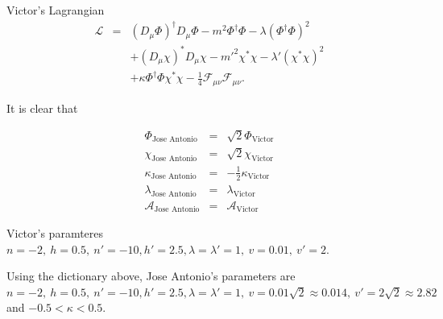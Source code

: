 \documentclass[10pt,a4paper]{article}
\begin{document}
Victor's Lagrangian
\begin{eqnarray} 
	\mathcal{L} & = & (D_{\mu}\Phi)^{\dagger}D_{\mu}\Phi - m^2\Phi^{\dagger}\Phi - \lambda(\Phi^{\dagger}\Phi)^2 \nonumber\\
 & & +(D_{\mu} \chi)^*D_{\mu} \chi - m'^2\chi^*\chi - \lambda'(\chi^* \chi)^2  \nonumber \\ 
 & & +\kappa\Phi^\dagger\Phi\chi^*\chi- \frac{1}{4}\mathcal{F}_{\mu\nu}\mathcal{F}_{\mu\nu}. %
\end{eqnarray}

%

It is clear that

\begin{eqnarray*}
 \Phi_{\text{Jose Antonio}}    & = &\sqrt{2}\Phi_{\text{Victor}}\\
 \chi_{\text{Jose Antonio}}    & = &\sqrt{2}\chi_{\text{Victor}}\\
 \kappa_{\text{Jose Antonio}}  & = &-\frac{1}{2}\kappa_{\text{Victor}}\\
 \lambda_{\text{Jose Antonio}} & = &\lambda_{\text{Victor}} \\
 \mathcal{A}_{\text{Jose Antonio}} & = &\mathcal{A}_{\text{Victor}}
\end{eqnarray*}


Victor's paramteres $n = -2,\  h = 0.5,\ n' = -10, h' = 2.5, \lambda=\lambda' = 1,\ v =0.01,\ v' = 2 $.

Using the dictionary above, Jose Antonio's parameters are $n = -2,\  h = 0.5,\ n' = -10, h' = 2.5, \lambda=\lambda' = 1,\ v =0.01\sqrt{2} \approx 0.014,\ v' = 2\sqrt{2}\approx 2.82 $ and $-0.5<\kappa<0.5$.
\end{document}

